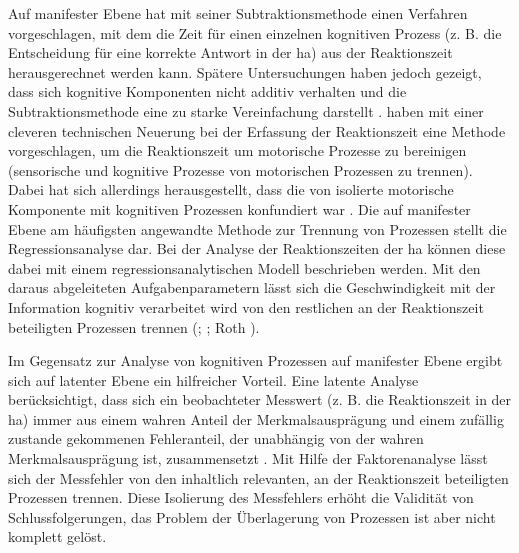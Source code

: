 \documentclass[11pt, twoside, a4paper]{book}		%
\begin{document}
Auf manifester Ebene hat \citet{Donders1969} mit seiner Subtraktionsmethode einen Verfahren vorgeschlagen, mit dem die Zeit für einen einzelnen kognitiven Prozess (z. B. die Entscheidung für eine korrekte Antwort in der \gls{ha}) aus der Reaktionszeit herausgerechnet werden kann. Spätere Untersuchungen haben jedoch gezeigt, dass sich kognitive Komponenten nicht additiv verhalten und die Subtraktionsmethode eine zu starke Vereinfachung darstellt \citep[z. B.][]{Friston1996, Ilan1994}.
\citet{Jensen1979} haben mit einer cleveren technischen Neuerung bei der Erfassung der Reaktionszeit eine Methode vorgeschlagen, um die Reaktionszeit um motorische Prozesse zu bereinigen (sensorische und kognitive Prozesse von motorischen Prozessen zu trennen). Dabei hat sich allerdings herausgestellt, dass die von \citet{Jensen1979} isolierte motorische Komponente mit kognitiven Prozessen konfundiert war \citep{Jensen1979, Smith1987b}.
Die auf manifester Ebene am häufigsten angewandte Methode zur Trennung von Prozessen stellt die Regressionsanalyse dar. Bei der Analyse der Reaktionszeiten der \gls{ha} können diese dabei mit einem regressionsanalytischen Modell beschrieben werden. Mit den daraus abgeleiteten Aufgabenparametern lässt sich die Geschwindigkeit mit der Information kognitiv verarbeitet wird von den restlichen an der Reaktionszeit beteiligten Prozessen trennen (\citealp{Hick1952}; \citealp{Jensen1998a}; Roth \citealp[1964; zitiert nach][S. 105]{Jensen1987a}).

Im Gegensatz zur Analyse von kognitiven Prozessen auf manifester Ebene ergibt sich auf latenter Ebene ein hilfreicher Vorteil. Eine latente Analyse berücksichtigt, dass sich ein beobachteter Messwert (z. B. die Reaktionszeit in der \gls{ha}) immer aus einem wahren Anteil der Merkmalsausprägung und einem  zufällig zustande gekommenen Fehleranteil, der unabhängig von der wahren Merkmalsausprägung ist, zusammensetzt \citep{Moosbrugger2007}. 
Mit Hilfe der Faktorenanalyse lässt sich der Messfehler von den inhaltlich relevanten, an der Reaktionszeit beteiligten Prozessen trennen. Diese Isolierung des Messfehlers erhöht die Validität von Schlussfolgerungen, das Problem der Überlagerung von Prozessen ist aber nicht komplett gelöst. 
\end{document}
